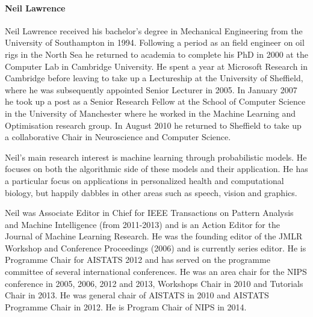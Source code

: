 \paragraph{Neil Lawrence}

%




Neil Lawrence received his bachelor's degree in Mechanical Engineering from the University of Southampton in 1994. Following a period as an field engineer on oil rigs in the North Sea he returned to academia to complete his PhD in 2000 at the Computer Lab in Cambridge University. He spent a year at Microsoft Research in Cambridge before leaving to take up a Lectureship at the University of Sheffield, where he was subsequently appointed Senior Lecturer in 2005. In January 2007 he took up a post as a Senior Research Fellow at the School of Computer Science in the University of Manchester where he worked in the Machine Learning and Optimisation research group. In August 2010 he returned to Sheffield to take up a collaborative Chair in Neuroscience and Computer Science.

Neil's main research interest is machine learning through probabilistic models. He focuses on both the algorithmic side of these models and their application. He has a particular focus on applications in personalized health and computational biology, but happily dabbles in other areas such as speech, vision and graphics.

Neil was Associate Editor in Chief for IEEE Transactions on Pattern Analysis and Machine Intelligence (from 2011-2013) and is an Action Editor for the Journal of Machine Learning Research. He was the founding editor of the JMLR Workshop and Conference Proceedings (2006) and is currently series editor. He is Programme Chair for AISTATS 2012 and has served on the programme committee of several international conferences. He was an area chair for the NIPS conference in 2005, 2006, 2012 and 2013, Workshops Chair in 2010 and Tutorials Chair in 2013. He was general chair of AISTATS in 2010 and AISTATS Programme Chair in 2012. He is Program Chair of NIPS in 2014.

